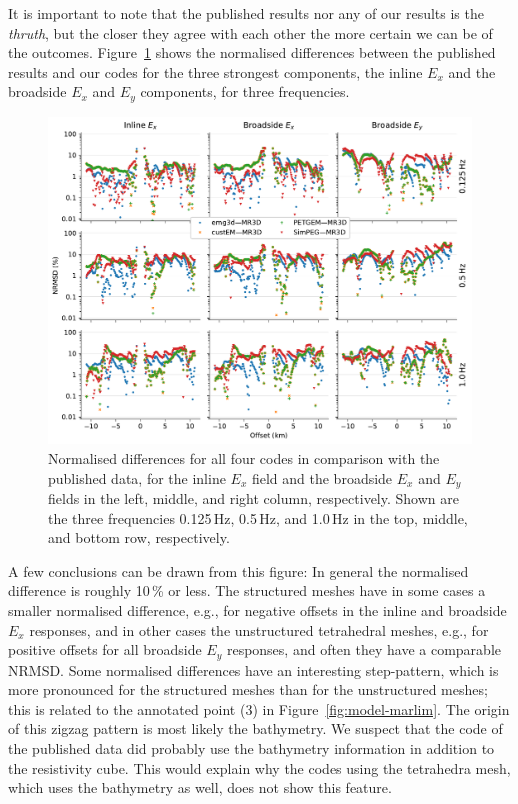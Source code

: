 \documentclass[onecolumn,extra,camera]{gji}
\begin{document}
It is important to note that the published results nor any of our results is the \emph{thruth}, but the closer they agree with each other the more certain we can be of the outcomes. Figure~\ref{fig:results-marlim_2published} shows the normalised differences between the published results and our codes for the three strongest components, the inline $E_x$ and the broadside $E_x$ and $E_y$ components, for three frequencies.
%
\begin{figure}
  \centering
  \includegraphics[width=.9\linewidth]{figures/results-marlim_2published}
  \caption{Normalised differences for all four codes in comparison with the published data, for the inline $E_x$ field and the broadside $E_x$ and $E_y$ fields in the left, middle, and right column, respectively. Shown are the three frequencies 0.125\,Hz, 0.5\,Hz, and 1.0\,Hz in the top, middle, and bottom row, respectively.}
  \label{fig:results-marlim_2published}
\end{figure}
%
A few conclusions can be drawn from this figure: In general the normalised difference is roughly 10\,\% or less. The structured meshes have in some cases a smaller normalised difference, e.g., for negative offsets in the inline and broadside $E_x$ responses, and in other cases the unstructured tetrahedral meshes, e.g., for positive offsets for all broadside $E_y$ responses, and often they have a comparable NRMSD. Some normalised differences have an interesting step-pattern, which is more pronounced for the structured meshes than for the unstructured meshes; this is related to the annotated point (3) in Figure~\ref{fig:model-marlim}. The origin of this zigzag pattern is most likely the bathymetry. We suspect that the code of the published data did probably use the bathymetry information in addition to the resistivity cube. This would explain why the codes using the tetrahedra mesh, which uses the bathymetry as well, does not show this feature.
\end{document}
